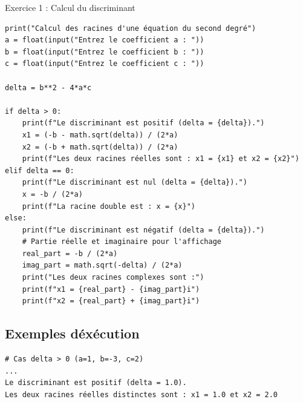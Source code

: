 \documentclass[10pt,a4paper]{article}
\begin{document}
\begin{exoBox}{Exercice 1 : Calcul du discriminant}
\begin{minipage}{\linewidth}
\begin{lstlisting}
print("Calcul des racines d'une équation du second degré")
a = float(input("Entrez le coefficient a : "))
b = float(input("Entrez le coefficient b : "))
c = float(input("Entrez le coefficient c : "))

delta = b**2 - 4*a*c

if delta > 0:
    print(f"Le discriminant est positif (delta = {delta}).")
    x1 = (-b - math.sqrt(delta)) / (2*a)
    x2 = (-b + math.sqrt(delta)) / (2*a)
    print(f"Les deux racines réelles sont : x1 = {x1} et x2 = {x2}")
elif delta == 0:
    print(f"Le discriminant est nul (delta = {delta}).")
    x = -b / (2*a)
    print(f"La racine double est : x = {x}")
else:
    print(f"Le discriminant est négatif (delta = {delta}).")
    # Partie réelle et imaginaire pour l'affichage
    real_part = -b / (2*a)
    imag_part = math.sqrt(-delta) / (2*a)
    print("Les deux racines complexes sont :")
    print(f"x1 = {real_part} - {imag_part}i")
    print(f"x2 = {real_part} + {imag_part}i")
\end{lstlisting}
\end{minipage}

\subsection*{Exemples d\'exécution}
\begin{verbatim}
# Cas delta > 0 (a=1, b=-3, c=2)
...
Le discriminant est positif (delta = 1.0).
Les deux racines réelles distinctes sont : x1 = 1.0 et x2 = 2.0
\end{verbatim}
\end{exoBox}
\vspace{0.5cm}
\end{document}
